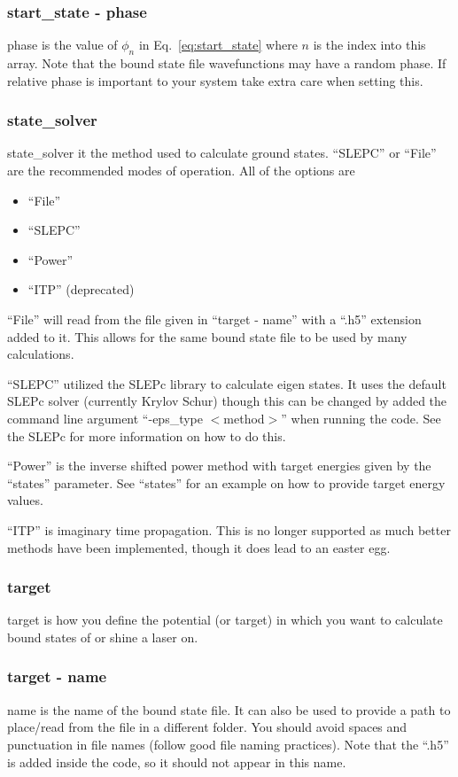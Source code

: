 \documentclass{article}
\begin{document}
\subsubsection{start\_state - phase}
phase is the value of $\phi_n$ in Eq.~\ref{eq:start_state} where $n$ is the index into this array. Note that the bound state file wavefunctions may have a random phase. If relative phase is important to your system take extra care when setting this.

\subsubsection{state\_solver}
\label{ssub:state_solver}
state\_solver it the method used to calculate ground states. ``SLEPC'' or ``File'' are the recommended modes of operation. All of the options are
\begin{itemize}
  \item ``File''
  \item ``SLEPC''
  \item ``Power''
  \item ``ITP'' (deprecated)
\end{itemize}

``File'' will read from the file given in ``target - name'' with a ``.h5'' extension added to it. This allows for the same bound state file to be used by many calculations.

``SLEPC'' utilized the SLEPc library to calculate eigen states. It uses the default SLEPc solver (currently Krylov Schur) though this can be changed by added the command line argument ``-eps\_type $<$method$>$'' when running the code. See the SLEPc for more information on how to do this.

``Power'' is the inverse shifted power method with target energies given by the ``states'' parameter. See ``states'' for an example on how to provide target energy values.

``ITP'' is imaginary time propagation. This is no longer supported as much better methods have been implemented, though it does lead to an easter egg.

\subsubsection{target}
target is how you define the potential (or target) in which you want to calculate bound states of or shine a laser on.

\subsubsection{target - name}
\label{ssub:target_name}
name is the name of the bound state file. It can also be used to provide a path to place/read from the file in a different folder. You should avoid spaces and punctuation in file names (follow good file naming practices). Note that the ``.h5'' is added inside the code, so it should not appear in this name.
\end{document}

